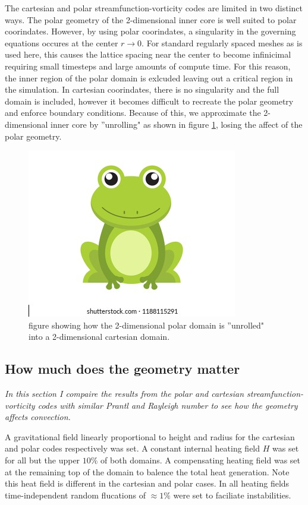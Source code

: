 \documentclass{article}
\begin{document}
The cartesian and polar streamfunction-vorticity codes are limited in two 
distinct ways. The polar geometry of the 2-dimensional inner core is well 
suited to polar coorindates. However, by using polar coorindates, a 
singularity in the governing equations occures at the center 
$r \rightarrow 0$. For standard regularly spaced meshes as is used here, 
this causes the lattice spacing near the center to become infinicimal 
requiring small timesteps and large amounts of compute time. For this 
reason, the inner region of the polar domain is exlcuded leaving out a 
critical region in the simulation. In cartesian coorindates, there is no 
singularity and the full domain is included, however it becomes difficult 
to recreate the polar geometry and enforce boundary conditions. Because of 
this, we approximate the 2-dimensional inner core by ''unrolling" as shown 
in figure \ref{unrolling}, losing the affect of the polar geometry. 


\begin{figure}[h!]
	\centering
	\includegraphics{frog.png}
	\caption{figure showing how the 2-dimensional polar domain is ''unrolled" into a 2-dimensional cartesian domain.}
	\label{unrolling}
\end{figure}

\subsection*{How much does the geometry matter}
{\it{In this section I compaire the results from the polar and cartesian streamfunction-vorticity codes with similar Prantl and Rayleigh number to see how the geometry affects convection.}}

A gravitational field linearly proportional to height and radius for the 
cartesian and polar codes respectively was set. A constant internal 
heating field $H$ was set for all but the upper $10 \%$ of both domains. A 
compensating heating field was set at the remaining top of the domain to 
balence the total heat generation. Note this heat field is different in 
the cartesian and polar cases. In all heating fields time-independent 
random flucations of $\approx 1 \%$ were set to faciliate instabilities.
\end{document}

